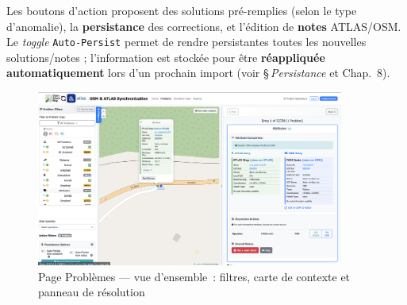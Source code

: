 Les boutons d'action proposent des solutions pré-remplies (selon le type d'anomalie), la \textbf{persistance} des corrections, et l'édition de \textbf{notes} ATLAS/OSM. Le \textit{toggle} \texttt{Auto-Persist} permet de rendre persistantes toutes les nouvelles solutions/notes ; l'information est stockée pour être \textbf{réappliquée automatiquement} lors d'un prochain import (voir \S\,\emph{Persistance} et Chap.~8).

\begin{figure}[h]
  \centering
  \includegraphics[width=0.9\textwidth]{../figures/chap9/problems page.png}
  \caption[Page Problèmes — vue d'ensemble]{Page Problèmes — vue d'ensemble : filtres, carte de contexte et panneau de résolution}
  \label{fig:frontend-problems}
\end{figure}

